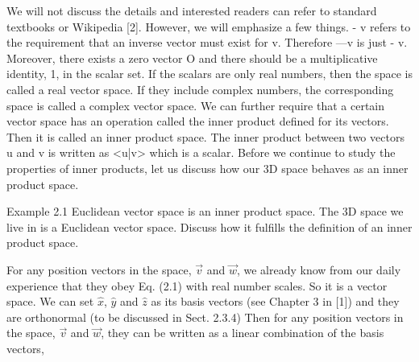 \documentclass{article}
\begin{document}
We will not discuss the details and interested readers can refer to standard textbooks or Wikipedia [2]. However, we will emphasize a few things. - v refers to the requirement that an inverse vector must exist for v. Therefore —v is just - v.
Moreover, there exists a zero vector O and there should be a multiplicative identity, 1, in the scalar set.
If the scalars are only real numbers, then the space is called a real vector space. If they include complex numbers, the corresponding space is called a complex vector
space.
We can further require that a certain vector space has an operation called the inner product defined for its vectors. Then it is called an inner product space. The inner product between two vectors u and v is written as <u|v> which is a scalar.
Before we continue to study the properties of inner products, let us discuss how our 3D space behaves as an inner product space.

Example 2.1 Euclidean vector space is an inner product space. The 3D space we live in is a Euclidean vector space. Discuss how it fulfills the definition of an inner product space.

For any position vectors in the space, $\vec{v}$ and $\vec{w}$, we already know from our daily experience that they obey Eq. (2.1) with real number scales. So it is a vector space.
We can set $\hat{x}$, $\hat{y}$ and $\hat{z}$ as its basis vectors (see Chapter 3 in [1]) and they are orthonormal (to be discussed in Sect. 2.3.4) 
Then for any position vectors in the space, $\vec{v}$ and $\vec{w}$, they
can be written as a linear combination of the basis vectors,
\end{document}
